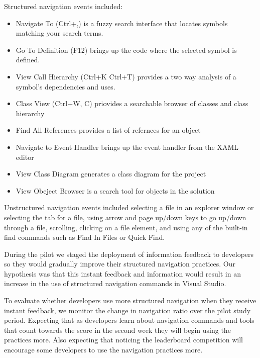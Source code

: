 \documentclass{sig-alternate}
\begin{document}
Structured navigation events included: 
\begin{itemize}
\item Navigate To (Ctrl+,) is a fuzzy search interface that locates symbols matching your search terms.
\item Go To Definition (F12) brings up the code where the selected symbol is defined. 
\item View Call Hierarchy (Ctrl+K Ctrl+T) provides a two way analysis of a symbol's dependencies and uses. 
\item Class View (Ctrl+W, C) priovides a searchable browser of classes and class hierarchy
\item Find All References provides a list of refernces for an object
\item Navigate to Event Handler brings up the event handler from the XAML editor
\item View Class Diagram generates a class diagram for the project
\item View Obeject Browser is a search tool for objects in the solution
\end{itemize}

Unstructured navigation events included selecting a file in an explorer window or selecting the tab for a file, using arrow and page up/down keys to go up/down through a file, scrolling, clicking on a file element, and using any of the built-in find commands such as Find In Files or Quick Find.

During the pilot we staged the deployment of information feedback to developers so they would gradually improve their structured navigation practices.  Our hypothesis was that this instant feedback and information would result in an increase in the use of structured navigation commands in Visual Studio.

To evaluate whether developers use more structured navigation when they receive instant feedback, we monitor the change in navigation ratio over the pilot study period.   Expecting that as developers learn about navigation commands and tools that count towards the score in the second week they will begin using the practices more.  Also expecting that noticing the leaderboard competition will encourage some developers to use the navigation practices more.  
\end{document}
